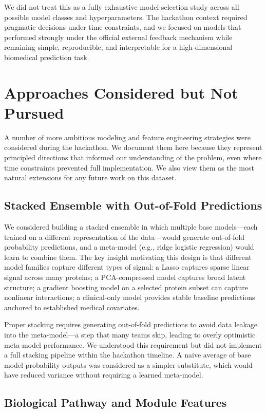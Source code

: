 \documentclass[11pt]{article}
\begin{document}
We did not treat this as a fully exhaustive model-selection study across all possible model classes and hyperparameters. The hackathon context required pragmatic decisions under time constraints, and we focused on models that performed strongly under the official external feedback mechanism while remaining simple, reproducible, and interpretable for a high-dimensional biomedical prediction task.

\section{Approaches Considered but Not Pursued}

A number of more ambitious modeling and feature engineering strategies were considered during the hackathon. We document them here because they represent principled directions that informed our understanding of the problem, even where time constraints prevented full implementation. We also view them as the most natural extensions for any future work on this dataset.


\subsection*{Stacked Ensemble with Out-of-Fold Predictions}

We considered building a stacked ensemble in which multiple base models---each trained on a different representation of the data---would generate out-of-fold probability predictions, and a meta-model (e.g., ridge logistic regression) would learn to combine them. The key insight motivating this design is that different model families capture different types of signal: a Lasso captures sparse linear signal across many proteins; a PCA-compressed model captures broad latent structure; a gradient boosting model on a selected protein subset can capture nonlinear interactions; a clinical-only model provides stable baseline predictions anchored to established medical covariates.


Proper stacking requires generating out-of-fold predictions to avoid data leakage into the meta-model---a step that many teams skip, leading to overly optimistic meta-model performance. We understood this requirement but did not implement a full stacking pipeline within the hackathon timeline. A naive average of base model probability outputs was considered as a simpler substitute, which would have reduced variance without requiring a learned meta-model.


\subsection*{Biological Pathway and Module Features}
\end{document}
